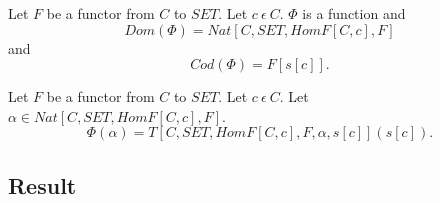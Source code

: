 \documentclass{article}
\newcommand{\inn}{~\epsilon~}
\newcommand{\innn}{~\epsilon~} %
\begin{document}
\begin{forthel}
		\begin{axiom}
		Let $F$ be a functor from $C$ to $SET$. Let $c \innn C$. $\Phi$ is a function and
		$$Dom(\Phi) = Nat[C,SET,HomF[C,c],F]$$ and $$Cod(\Phi) = F[s[c]].$$
		\end{axiom}


		\begin{axiom}[PhiDef]
		Let $F$ be a functor from $C$ to $SET$. Let $c \innn C$.
		Let $\alpha \in Nat[C,SET,HomF[C,c],F]$.
		$$\Phi(\alpha) = T[C,SET,HomF[C,c],F,\alpha,s[c]](s[c]).$$
		\end{axiom}
		


	\end{forthel}
	
\subsection{Result}
\end{document}
